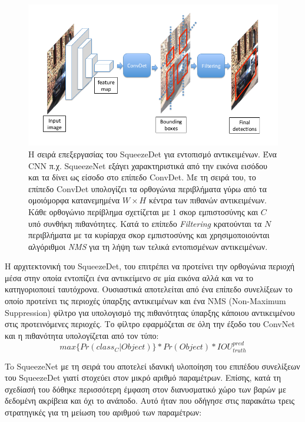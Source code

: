 \begin{figure}[H]
\centering
\includegraphics[width = \textwidth]{figures/SqueezeNetDet/SqueezeDet_architecture.png}
\caption[Αρχιτεκτονική SqueezeDet]{Η σειρά επεξεργασίας του SqueezeDet για εντοπισμό αντικειμένων. Ένα CNN π.χ. SqueezeNet εξάγει χαρακτηριστικά από την εικόνα εισόδου και τα δίνει ως είσοδο στο επίπεδο ConvDet. Με τη σειρά του, το επίπεδο ConvDet υπολογίζει τα ορθογώνια περιβλήματα γύρω από τα ομοιόμορφα κατανεμημένα $ W\times H$ κέντρα των πιθανών αντικειμένων. Κάθε ορθογώνιο περίβλημα σχετίζεται με $1$ σκορ εμπιστοσύνης και $C$ υπό συνθήκη πιθανότητες. Κατά το επίπεδο \textit{Filtering} κρατούνται τα $N$ περιβλήματα με τα κυρίαρχα σκορ εμπιστοσύνης και χρησιμοποιούνται αλγόριθμοι \textit{NMS} για τη λήψη των τελικά εντοπισμένων αντικειμένων.}
\label{fig:SqueezeDet_architecture}
\end{figure}


Η αρχιτεκτονική του SqueezeDet, του επιτρέπει να προτείνει την ορθογώνια περιοχή μέσα στην οποία εντοπίζει ένα αντικείμενο σε μία εικόνα αλλά και να το κατηγοριοποιεί ταυτόχρονα. Ουσιαστικά αποτελείται από ένα επίπεδο συνελίξεων το οποίο προτείνει τις περιοχές ύπαρξης αντικειμένων και ένα NMS (Non-Maximum Suppression) φίλτρο για υπολογισμό της πιθανότητας ύπαρξης κάποιου αντικειμένου στις προτεινόμενες περιοχές. Το φίλτρο εφαρμόζεται σε όλη την έξοδο του ConvNet και η πιθανότητα υπολογίζεται από τον τύπο:
$$ max \{ Pr\left(class_C| Object\right)\} * Pr(Object) * IOU^{pred}_{truth} $$

To SqueezeNet με τη σειρά του αποτελεί ιδανική υλοποίηση του επιπέδου συνελίξεων του SqueezeDet γιατί στοχεύει στον μικρό αριθμό παραμέτρων. Επίσης, κατά τη σχεδίασή του δόθηκε περισσότερη έμφαση στον διανυσματικό χώρο των βαρών με δεδομένη ακρίβεια και όχι το ανάποδο. Αυτό ήταν που οδήγησε στις παρακάτω τρεις στρατηγικές για τη μείωση του αριθμού των παραμέτρων:

